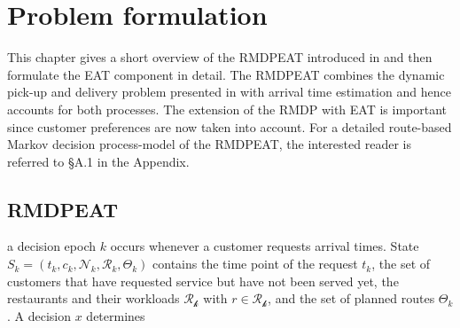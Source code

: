 \chapter{Problem formulation}

This chapter gives a short overview of the RMDPEAT introduced in \cite{Hildebrandt2020_EAT} and then formulate the EAT component in detail. The RMDPEAT combines the dynamic pick-up and delivery problem presented in \cite{UlmerRMDP} with arrival time estimation and hence accounts for both processes. The extension of the RMDP with EAT is important since customer preferences are now taken into account. For a detailed route-based Markov decision process-model of the RMDPEAT, the interested reader is referred to §A.1 in the Appendix.

\section{RMDPEAT} 




a decision epoch $ k $ occurs whenever a customer requests arrival times. State $ S_k = (t_k, c_k, \mathcal{N}_k, \mathcal{R}_k, \Theta_k)$ contains the time point of the request $ t_k $, the set of customers that have requested service but have not been served yet, the restaurants and their workloads $ \mathcal{R_k} $ with $ r \in \mathcal{R_k} $, and the set of planned routes $ \Theta_k $. A decision $ x $ determines 


























































































    